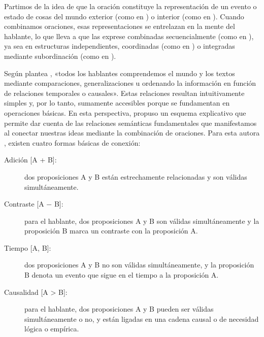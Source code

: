 Partimos de la idea de que la oración constituye la representación de un evento
o estado de cosas del mundo exterior (como en ) o interior (como en
). Cuando combinamos oraciones, esas representaciones se
entrelazan en la mente del hablante, lo que lleva a que las exprese combinadas
secuencialmente (como en ), ya sea en estructuras
independientes, coordinadas (como en ) o integradas
mediante subordinación (como en ).

Según plantea \textcite[4]{duque2025}, «todos los hablantes comprendemos el
mundo y los textos mediante comparaciones, generalizaciones u ordenando la
información en función de relaciones temporales o causales». Estas relaciones
resultan intuitivamente simples y, por lo tanto, sumamente accesibles porque se
fundamentan en operaciones básicas. En esta perspectiva,
\textcite{rudolph1988,rudolph1996} propuso un esquema explicativo que permite dar
cuenta de las relaciones semánticas fundamentales que manifestamos al conectar
nuestras ideas mediante la combinación de oraciones. Para esta autora
\parencite[20]{rudolph1996}, existen cuatro formas básicas de conexión:

\begin{description}
  \item[Adición {[A + B]}:] dos proposiciones A y B están estrechamente
        relacionadas y son válidas simultáneamente.
  \item[Contraste {[A $-$ B]}:] para el hablante, dos proposiciones A y B son
        válidas simultáneamente y la proposición B marca un contraste con la
        proposición A.
  \item[Tiempo {[A, B]}:] dos proposiciones A y B no son válidas simultáneamente,
        y la proposición B denota un evento que sigue en el tiempo a la
        proposición A.
  \item[Causalidad {[A > B]}:] para el hablante, dos proposiciones A y B pueden
        ser válidas simultáneamente o no, y están ligadas en una cadena causal o
        de necesidad lógica o empírica.
\end{description}

